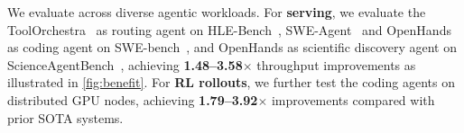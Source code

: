 We evaluate \ouralg across diverse agentic workloads. For \textbf{serving}, we evaluate the ToolOrchestra~\citep{su2025toolorchestraelevatingintelligenceefficient} as routing agent on HLE-Bench~\citep{phan2025humanitysexam}, SWE-Agent~\citep{yang2024sweagentagentcomputerinterfacesenable} and OpenHands~\citep{wang2025openhandsopenplatformai} as coding agent on SWE-bench~\citep{jimenez2024swebenchlanguagemodelsresolve}, and OpenHands as scientific discovery agent on ScienceAgentBench~\citep{chen2024scienceagentbenchrigorousassessmentlanguage}, achieving \textbf{1.48--3.58$\times$} throughput improvements as illustrated in \autoref{fig:benefit}. For \textbf{RL rollouts}, we further test the coding agents on distributed GPU nodes, achieving  \textbf{1.79--3.92$\times$} improvements compared with prior SOTA systems.





